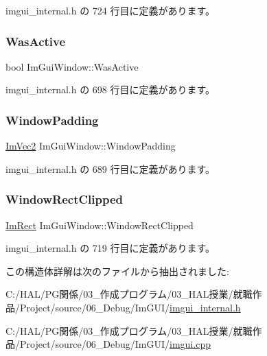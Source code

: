  imgui\+\_\+internal.\+h の 724 行目に定義があります。

\mbox{\label{struct_im_gui_window_ab346ec3a2f305948af05ec1871610a8f}} 
\subsubsection{\texorpdfstring{Was\+Active}{WasActive}}
{\footnotesize\ttfamily bool Im\+Gui\+Window\+::\+Was\+Active}



 imgui\+\_\+internal.\+h の 698 行目に定義があります。

\mbox{\label{struct_im_gui_window_a538d3d70ad8f71a4ec58a6a0560b2f02}} 
\subsubsection{\texorpdfstring{Window\+Padding}{WindowPadding}}
{\footnotesize\ttfamily \mbox{\hyperlink{struct_im_vec2}{Im\+Vec2}} Im\+Gui\+Window\+::\+Window\+Padding}



 imgui\+\_\+internal.\+h の 689 行目に定義があります。

\mbox{\label{struct_im_gui_window_ae0af9ff6c93baad6848143dd9d742ddd}} 
\subsubsection{\texorpdfstring{Window\+Rect\+Clipped}{WindowRectClipped}}
{\footnotesize\ttfamily \mbox{\hyperlink{struct_im_rect}{Im\+Rect}} Im\+Gui\+Window\+::\+Window\+Rect\+Clipped}



 imgui\+\_\+internal.\+h の 719 行目に定義があります。



この構造体詳解は次のファイルから抽出されました\+:\begin{DoxyCompactItemize}
\item 
C\+:/\+H\+A\+L/\+P\+G関係/03\+\_\+作成プログラム/03\+\_\+\+H\+A\+L授業/就職作品/\+Project/source/06\+\_\+\+Debug/\+Im\+G\+U\+I/\mbox{\hyperlink{imgui__internal_8h}{imgui\+\_\+internal.\+h}}\item 
C\+:/\+H\+A\+L/\+P\+G関係/03\+\_\+作成プログラム/03\+\_\+\+H\+A\+L授業/就職作品/\+Project/source/06\+\_\+\+Debug/\+Im\+G\+U\+I/\mbox{\hyperlink{imgui_8cpp}{imgui.\+cpp}}\end{DoxyCompactItemize}
